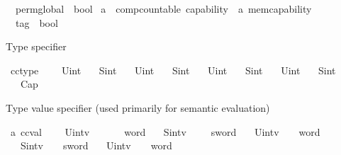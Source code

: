 \begin{isabellebody}
\ \ perm{\isacharunderscore}{\kern0pt}global\ {\isacharcolon}{\kern0pt}{\isacharcolon}{\kern0pt}\ bool\isanewline
\isanewline
{}\isamarkupfalse%
\ {\isacharparenleft}{\kern0pt}{\isacharprime}{\kern0pt}a\ {\isacharcolon}{\kern0pt}{\isacharcolon}{\kern0pt}\ comp{\isacharunderscore}{\kern0pt}countable{\isacharparenright}{\kern0pt}\ capability\ {\isacharequal}{\kern0pt}\ {\isachardoublequoteopen}{\isacharprime}{\kern0pt}a\ mem{\isacharunderscore}{\kern0pt}capability{\isachardoublequoteclose}\ {\isacharplus}{\kern0pt}\ \isanewline
\ \ \isanewline
\ \ tag\ {\isacharcolon}{\kern0pt}{\isacharcolon}{\kern0pt}\ bool%
\begin{isamarkuptext}%
Type specifier%
\end{isamarkuptext}\isamarkuptrue%
\isamarkupfalse%
\ cctype\ {\isacharequal}{\kern0pt}\ \isanewline
\ \ Uint{}\isanewline
\ \ {\isacharbar}{\kern0pt}\ Sint{}\isanewline
\ \ {\isacharbar}{\kern0pt}\ Uint{}{}\isanewline
\ \ {\isacharbar}{\kern0pt}\ Sint{}{}\isanewline
\ \ {\isacharbar}{\kern0pt}\ Uint{}{}\isanewline
\ \ {\isacharbar}{\kern0pt}\ Sint{}{}\isanewline
\ \ {\isacharbar}{\kern0pt}\ Uint{}{}\isanewline
\ \ {\isacharbar}{\kern0pt}\ Sint{}{}\isanewline
\ \ {\isacharbar}{\kern0pt}\ Cap%
\begin{isamarkuptext}%
Type value specifier (used primarily for semantic evaluation)%
\end{isamarkuptext}\isamarkuptrue%
\isamarkupfalse%
\ {\isacharprime}{\kern0pt}a\ ccval\ {\isacharequal}{\kern0pt}\ \isanewline
\ \ Uint{}{\isacharunderscore}{\kern0pt}v\ \ \ \ \ \ {\isachardoublequoteopen}{}\ word{\isachardoublequoteclose}\isanewline
\ \ {\isacharbar}{\kern0pt}\ Sint{}{\isacharunderscore}{\kern0pt}v\ \ \ \ {\isachardoublequoteopen}{}\ sword{\isachardoublequoteclose}\isanewline
\ \ {\isacharbar}{\kern0pt}\ Uint{}{}{\isacharunderscore}{\kern0pt}v\ \ \ {\isachardoublequoteopen}{}{}\ word{\isachardoublequoteclose}\isanewline
\ \ {\isacharbar}{\kern0pt}\ Sint{}{}{\isacharunderscore}{\kern0pt}v\ \ \ {\isachardoublequoteopen}{}{}\ sword{\isachardoublequoteclose}\isanewline
\ \ {\isacharbar}{\kern0pt}\ Uint{}{}{\isacharunderscore}{\kern0pt}v\ \ \ {\isachardoublequoteopen}{}{}\ word{\isachardoublequoteclose}\isanewline

\end{isabellebody}
